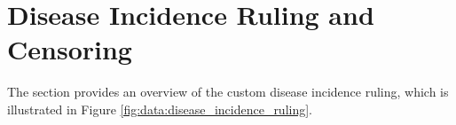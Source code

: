 
\section{Disease Incidence Ruling and Censoring}
\label{section:data:disease_incidence_ruling_censoring}
The section provides an overview of the custom disease incidence ruling, which is illustrated in Figure \ref{fig:data:disease_incidence_ruling}. 

